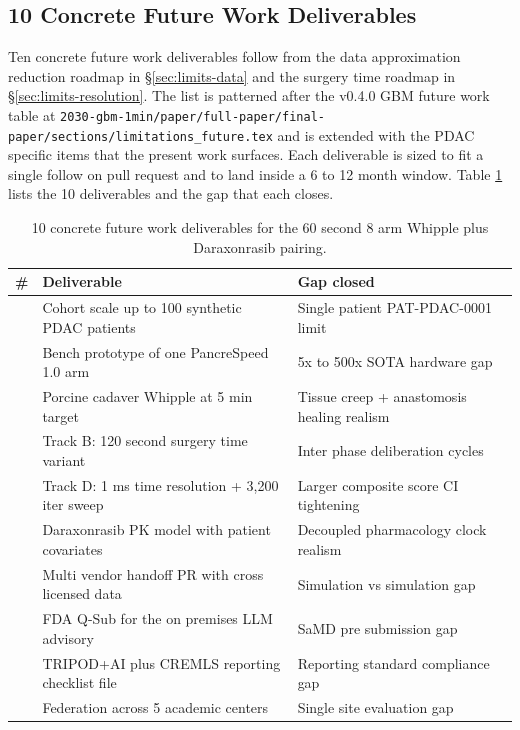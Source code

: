 \subsection{10 Concrete Future Work Deliverables}
\label{sec:limits-future}

Ten concrete future work deliverables follow from the data
approximation reduction roadmap in \S \ref{sec:limits-data} and
the surgery time roadmap in \S \ref{sec:limits-resolution}. The
list is patterned after the v0.4.0 GBM future work table at
\texttt{2030-gbm-1min/paper/full-paper/final-paper/sections/limitations_future.tex}
\cite{kawchak_2026_20113157} and is extended with the PDAC
specific items that the present work surfaces. Each deliverable
is sized to fit a single follow on pull request and to land
inside a 6 to 12 month window. Table \ref{tab:limits-future}
lists the 10 deliverables and the gap that each closes.

\begin{table}[H]
\caption{10 concrete future work deliverables for the 60 second 8 arm Whipple plus Daraxonrasib pairing.}
\label{tab:limits-future}
\centering
\begin{tabular}{>{\raggedright\arraybackslash}p{0.7cm} >{\raggedright\arraybackslash}p{6.0cm} >{\raggedright\arraybackslash}p{6.7cm}}
\toprule
\textbf{\#} & \textbf{Deliverable} & \textbf{Gap closed} \\
\midrule
  1 & Cohort scale up to 100 synthetic PDAC patients & Single patient PAT-PDAC-0001 limit \\
  2 & Bench prototype of one PancreSpeed 1.0 arm & 5x to 500x SOTA hardware gap \\
  3 & Porcine cadaver Whipple at 5 min target & Tissue creep + anastomosis healing realism \\
  4 & Track B: 120 second surgery time variant & Inter phase deliberation cycles \\
  5 & Track D: 1 ms time resolution + 3,200 iter sweep & Larger composite score CI tightening \\
  6 & Daraxonrasib PK model with patient covariates & Decoupled pharmacology clock realism \\
  7 & Multi vendor handoff PR with cross licensed data & Simulation vs simulation gap \\
  8 & FDA Q-Sub for the on premises LLM advisory & SaMD pre submission gap \\
  9 & TRIPOD+AI plus CREMLS reporting checklist file & Reporting standard compliance gap \\
  10 & Federation across 5 academic centers & Single site evaluation gap \\
\bottomrule
\end{tabular}
\end{table}
